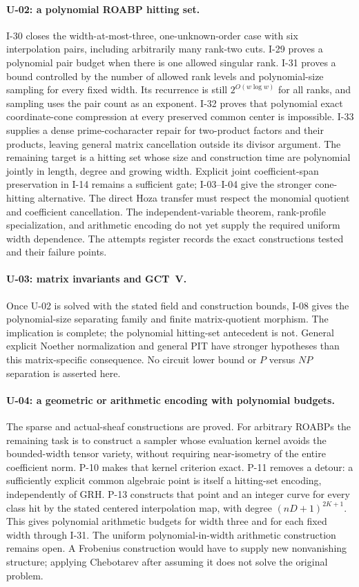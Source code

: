\paragraph{U-02: a polynomial ROABP hitting set.}
I-30 closes the width-at-most-three, one-unknown-order case with six interpolation pairs, including arbitrarily many rank-two cuts. I-29 proves a polynomial pair budget when there is one allowed singular rank. I-31 proves a bound controlled by the number of allowed rank levels and polynomial-size sampling for every fixed width. Its recurrence is still $2^{O(w\log w)}$ for all ranks, and sampling uses the pair count as an exponent. I-32 proves that polynomial exact coordinate-cone compression at every preserved common center is impossible. I-33 supplies a dense prime-cocharacter repair for two-product factors and their products, leaving general matrix cancellation outside its divisor argument. The remaining target is a hitting set whose size and construction time are polynomial jointly in length, degree and growing width. Explicit joint coefficient-span preservation in I-14 remains a sufficient gate; I-03--I-04 give the stronger cone-hitting alternative. The direct Hoza transfer must respect the monomial quotient and coefficient cancellation. The independent-variable theorem, rank-profile specialization, and arithmetic encoding do not yet supply the required uniform width dependence. The attempts register records the exact constructions tested and their failure points.

\paragraph{U-03: matrix invariants and GCT~V.}
Once U-02 is solved with the stated field and construction bounds, I-08 gives the polynomial-size separating family and finite matrix-quotient morphism. The implication is complete; the polynomial hitting-set antecedent is not. General explicit Noether normalization and general PIT have stronger hypotheses than this matrix-specific consequence. No circuit lower bound or $P$ versus $NP$ separation is asserted here.

\paragraph{U-04: a geometric or arithmetic encoding with polynomial budgets.}
The sparse and actual-sheaf constructions are proved. For arbitrary ROABPs the remaining task is to construct a sampler whose evaluation kernel avoids the bounded-width tensor variety, without requiring near-isometry of the entire coefficient norm. P-10 makes that kernel criterion exact. P-11 removes a detour: a sufficiently explicit common algebraic point is itself a hitting-set encoding, independently of GRH. P-13 constructs that point and an integer curve for every class hit by the stated centered interpolation map, with degree $(nD+1)^{2K+1}$. This gives polynomial arithmetic budgets for width three and for each fixed width through I-31. The uniform polynomial-in-width arithmetic construction remains open. A Frobenius construction would have to supply new nonvanishing structure; applying Chebotarev after assuming it does not solve the original problem.

